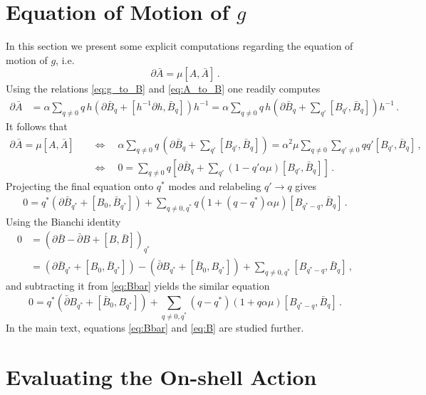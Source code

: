 \documentclass[11pt,a4paper]{article}
\numberwithin{equation}{section}
\numberwithin{table}{section}\setlength{\multlinegap}{25pt}
\begin{document}
\section{Equation of Motion of $g$}\label{sec:app_eomg}

In this section we present some explicit computations regarding the equation of motion of $g$, i.e.
\begin{equation}
	\partial\bar{A}=\mu[A,\bar{A}]\,.
\end{equation}
Using the relations \eqref{eq:g_to_B} and \eqref{eq:A_to_B} one readily computes
\begin{align}
	\partial\bar{A} &= \alpha \sum_{q\neq 0} q\, h\left( \partial\bar{B}_q + [h^{-1}\partial h, \bar{B}_q]\right)h^{-1} = \alpha \sum_{q\neq 0} q\,h \left( \partial\bar{B}_q + \sum_{q'} [B_{q'},\bar{B}_q]\right) h^{-1}\,.
\end{align}
It follows that
\begin{align}
	\partial\bar{A} = \mu[A,\bar{A}]\quad &\iff \quad \alpha \sum_{q\neq 0} q\, \left( \partial\bar{B}_q + \sum_{q'} [B_{q'},\bar{B}_q]\right) = \alpha^2 \mu \sum_{q\neq 0} \sum_{q'\neq 0} q q' [B_{q'},\bar{B}_q]\,,\\
	&\iff\quad  0= \sum_{q\neq 0}q\left[ \partial\bar{B}_q+ \sum_{q'}(1-q'\alpha\mu)[B_{q'},\bar{B}_q]\right]\,.
\end{align}
Projecting the final equation onto $q^*$ modes and relabeling $q'\rightarrow q$ gives
\begin{align}\label{eq:Bbar}
	 0=q^*\left(\partial\bar{B}_{q^*}+[B_0,\bar{B}_{q^*}]\right) + \sum_{q\neq 0,q^*}q (1+(q-q^*)\alpha\mu)[B_{q^*-q}, \bar{B}_{q}]\,.
\end{align}
Using the Bianchi identity
\begin{align}
	0 &= (\partial\bar{B}-\bar{\partial}B+[B,\bar{B}])_{q^*}\\
	&=\left(\partial\bar{B}_{q^*}+[B_0,\bar{B}_{q^*}]\right)-\left(\bar{\partial}B_{q^*}+[\bar{B}_0,B_{q^*}]\right)+\sum_{q\neq 0,q^*} [B_{q^*-q},\bar{B}_q]\,,
\end{align}
and subtracting it from \eqref{eq:Bbar} yields the similar equation
\begin{equation}\label{eq:B}
	0=q^*\left(\bar{\partial}B_{q^*}+[\bar{B}_0,B_{q^*}]\right)+\sum_{q\neq 0,q^*}(q-q^*)(1+q\alpha\mu)[B_{q^*-q}, \bar{B}_{q}]\,.
\end{equation}
In the main text, equations \eqref{eq:Bbar} and \eqref{eq:B} are studied further.

\section{Evaluating the On-shell Action}\label{sec:app_action}
\end{document}
